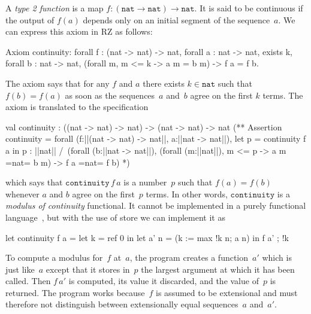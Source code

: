 A \emph{type 2 function} is a map $f : (\mathtt{nat} \to \mathtt{nat})
\to \mathtt{nat}$. It is said to be continuous if the output of $f(a)$
depends only on an initial segment of the sequence~$a$. We can express
this axiom in RZ as follows:
%
\begin{source}
Axiom continuity:
forall f : (nat -> nat) -> nat, forall a : nat -> nat,
  exists k, forall b : nat -> nat,
    (forall m, m <= k -> a m = b m) -> f a = f b.
\end{source}
%
The axiom says that for any $f$ and $a$ there exists $k \in
\mathtt{nat}$ such that $f(b) = f(a)$ as soon as the sequences~$a$
and~$b$ agree on the first $k$ terms. The axiom is translated to the
specification
%
\begin{source}
val continuity : ((nat -> nat) -> nat) -> (nat -> nat) -> nat
(**  Assertion continuity =
forall (f:||(nat -> nat) -> nat||, a:||nat -> nat||),
  let p = continuity f a in p : ||nat|| /\
  (forall (b:||nat -> nat||),
     (forall (m:||nat||),  m <= p -> a m =nat= b m) -> f a =nat= f b)
*)
\end{source}
%
which says that $\mathtt{continuity}\,f\,a$ is a number~$p$ such that
$f(a) = f(b)$ whenever $a$ and $b$ agree on the first~$p$ terms. In
other words, $\mathtt{continuity}$ is a \emph{modulus of continuity}
functional. It cannot be implemented in a purely functional
language~\cite{modulus-violates-ac2}, but with the use of store we can
implement it as
%
\begin{source}
let continuity f a =
  let k = ref 0 in
  let a' n = (k := max !k n; a n) in
    f a' ; !k
\end{source}
%
To compute a modulus for~$f$ at~$a$, the program creates a
function~$a'$ which is just like~$a$ except that it stores in~$p$ the
largest argument at which it has been called. Then $f\,a'$ is
computed, its value it discarded, and the value of~$p$ is returned.
The program works because~$f$ is assumed to be extensional and must
therefore not distinguish between extensionally equal sequences~$a$
and~$a'$.



